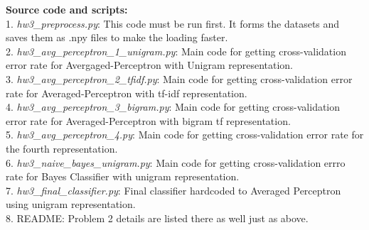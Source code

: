 \documentclass[fleqn]{article}
\begin{document}
\begin{itemize}
		\textbf{Source code and scripts:}\\
		1. \textit{hw3\_preprocess.py}: This code must be run first. It forms the datasets and saves them as .npy files to make the loading faster.\\
		2. \textit{hw3\_avg\_perceptron\_1\_unigram.py}: Main code for getting cross-validation error rate for Avergaged-Perceptron with Unigram representation.\\
		3. \textit{hw3\_avg\_perceptron\_2\_tfidf.py}: Main code for getting cross-validation error rate for Averaged-Perceptron with tf-idf representation.\\
		4. \textit{hw3\_avg\_perceptron\_3\_bigram.py}: Main code for getting cross-validation error rate for Averaged-Perceptron with bigram tf representation.\\
		5. \textit{hw3\_avg\_perceptron\_4.py}: Main code for getting cross-validation error rate for the fourth representation.\\
		6. \textit{hw3\_naive\_bayes\_unigram.py}: Main code for getting cross-validation errro rate for Bayes Classifier with unigram representation.\\
		7. \textit{hw3\_final\_classifier.py}: Final classifier hardcoded to Averaged Perceptron using unigram representation.\\
		8. README: Problem 2 details are listed there as well just as above.\\
 
\end{itemize}
\end{document}
